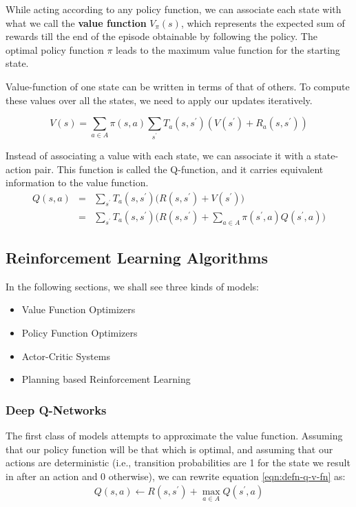 While acting according to any policy function, we can associate each state with what we call the \textbf{value function} $V_{\pi}(s)$, which represents the expected sum of rewards till the end of the episode obtainable by following the policy. The optimal policy function $\pi$ leads to the maximum value function for the starting state.

Value-function of one state can be written in terms of that of others. To compute these values over all the states, we need to apply our updates iteratively.

\begin{equation}
    V(s) = \sum_{a \in A} \pi(s, a) \sum_{s^\prime} T_a(s, s^\prime) (V(s^\prime) + R_a(s, s^\prime))
\end{equation}

Instead of associating a value with each state, we can associate it with a state-action pair. This function is called the Q-function, and it carries equivalent information to the value function.
\begin{eqnarray}
    Q(s, a) &=& \sum_{s^\prime} T_a(s, s^\prime) \bigg(R(s, s^\prime) + V(s^\prime) \bigg)\\
            &=& \sum_{s^\prime} T_a(s, s^\prime) \bigg(R(s, s^\prime) + \sum_{a \in A} \pi(s^\prime, a) Q(s^\prime, a)\bigg)
            \label{eqn:defn-q-v-fn}
\end{eqnarray}

\subsection{Reinforcement Learning Algorithms}

In the following sections, we shall see three kinds of models:
\begin{itemize}
    \item Value Function Optimizers
    \item Policy Function Optimizers
    \item Actor-Critic Systems
    \item Planning based Reinforcement Learning
\end{itemize}


\subsubsection{Deep Q-Networks}

The first class of models attempts to approximate the value function. Assuming that our policy function will be that which is optimal, and assuming that our actions are deterministic (i.e., transition probabilities are 1 for the state we result in after an action and 0 otherwise), we can rewrite equation \ref{eqn:defn-q-v-fn} as:
\begin{eqnarray}\label{eqn:defn-q-fn}
    Q(s, a) \leftarrow R(s, s^\prime) + \max_{a \in A} Q(s^\prime, a)
\end{eqnarray}

